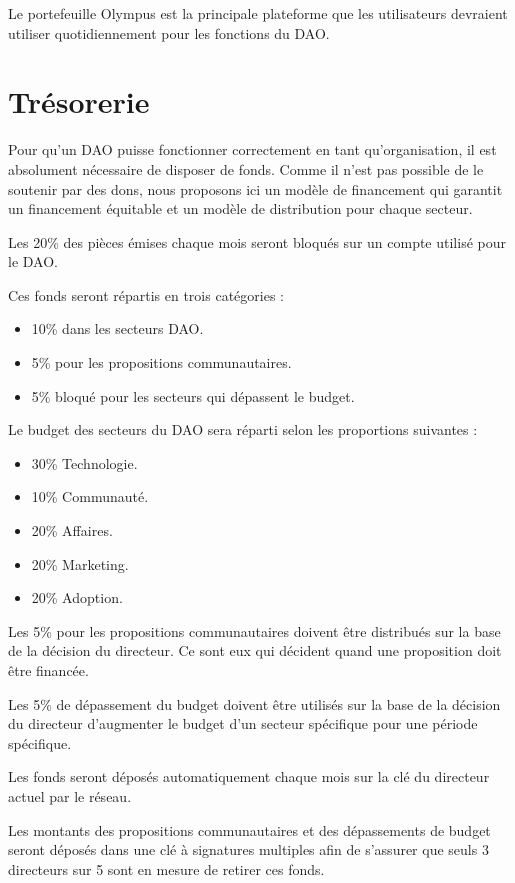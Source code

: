 \documentclass{article}
\begin{document}
Le portefeuille Olympus est la principale plateforme que les utilisateurs devraient utiliser quotidiennement pour les fonctions du DAO.

\section{Trésorerie}

Pour qu'un DAO puisse fonctionner correctement en tant qu'organisation, il est absolument nécessaire de disposer de fonds. Comme il n'est pas possible de le soutenir par des dons, nous proposons ici un modèle de financement qui garantit un financement équitable et un modèle de distribution pour chaque secteur.

Les 20\% des pièces émises chaque mois seront bloqués sur un compte utilisé pour le DAO.

Ces fonds seront répartis en trois catégories :

\begin{itemize}
  \item 10\% dans les secteurs DAO.
  \item 5\% pour les propositions communautaires.
  \item 5\% bloqué pour les secteurs qui dépassent le budget.
\end{itemize}

Le budget des secteurs du DAO sera réparti selon les proportions suivantes :

\begin{itemize}
  \item 30\% Technologie.
  \item 10\% Communauté.
  \item 20\% Affaires.
  \item 20\% Marketing.
  \item 20\% Adoption.
\end{itemize}

Les 5\% pour les propositions communautaires doivent être distribués sur la base de la décision du directeur. Ce sont eux qui décident quand une proposition doit être financée.

Les 5\% de dépassement du budget doivent être utilisés sur la base de la décision du directeur d'augmenter le budget d'un secteur spécifique pour une période spécifique.

Les fonds seront déposés automatiquement chaque mois sur la clé du directeur actuel par le réseau.

Les montants des propositions communautaires et des dépassements de budget seront déposés dans une clé à signatures multiples afin de s'assurer que seuls 3 directeurs sur 5 sont en mesure de retirer ces fonds.
\end{document}
